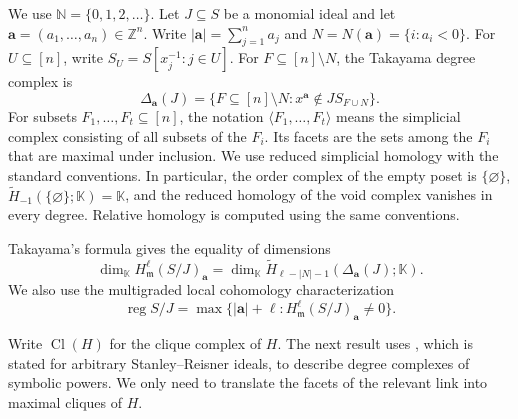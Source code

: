 \documentclass[11pt]{amsart}
\theoremstyle{definition}
\newcommand{\reg}{\operatorname{reg}}
\newcommand{\m}{\mathfrak m}
\newcommand{\NN}{\mathbb N}
\newcommand{\ZZ}{\mathbb Z}
\newcommand{\kk}{\mathbb K}
\begin{document}
We use $\NN=\{0,1,2,\dots\}$. Let $J\subseteq S$ be a monomial ideal and let $\mathbf a=(a_1,\dots,a_n)\in\ZZ^n$. Write $|\mathbf a|=\sum_{j=1}^n a_j$ and $N=N(\mathbf a)=\{i:a_i<0\}$. For $U\subseteq[n]$, write $S_U=S[x_j^{-1}:j\in U]$. For $F\subseteq[n]\setminus N$, the Takayama degree complex is
\[
\Delta_{\mathbf a}(J)
=
\bigl\{F\subseteq[n]\setminus N:
 x^{\mathbf a}\notin JS_{F\cup N}\bigr\}.
\]
For subsets $F_1,\dots,F_t\subseteq[n]$, the notation $\langle F_1,\dots,F_t\rangle$ means the simplicial complex consisting of all subsets of the $F_i$. Its facets are the sets among the $F_i$ that are maximal under inclusion. We use reduced simplicial homology with the standard conventions. In particular, the order complex of the empty poset is $\{\varnothing\}$, $\widetilde H_{-1}(\{\varnothing\};\kk)=\kk$, and the reduced homology of the void complex vanishes in every degree. Relative homology is computed using the same conventions.

Takayama's formula \cite[Theorem~1]{Takayama} gives the equality of dimensions
\begin{equation}\label{eq:2}
\dim_\kk H^\ell_{\m}(S/J)_{\mathbf a}
=
\dim_\kk\widetilde H_{\ell-|N|-1}
  (\Delta_{\mathbf a}(J);\kk).
\end{equation}
We also use the multigraded local cohomology characterization \cite[Proposition~2.5(ii)]{CHHKTT}
\begin{equation}\label{eq:3}
\reg S/J
=
\max\bigl\{
|\mathbf a|+\ell:
H^\ell_{\m}(S/J)_{\mathbf a}\ne0
\bigr\}.
\end{equation}

Write $\operatorname{Cl}(H)$ for the clique complex of $H$. The next result uses \cite[Lemma~1.3]{HoaTrung2016}, which is stated for arbitrary Stanley--Reisner ideals, to describe degree complexes of symbolic powers. We only need to translate the facets of the relevant link into maximal cliques of $H$.
\end{document}
